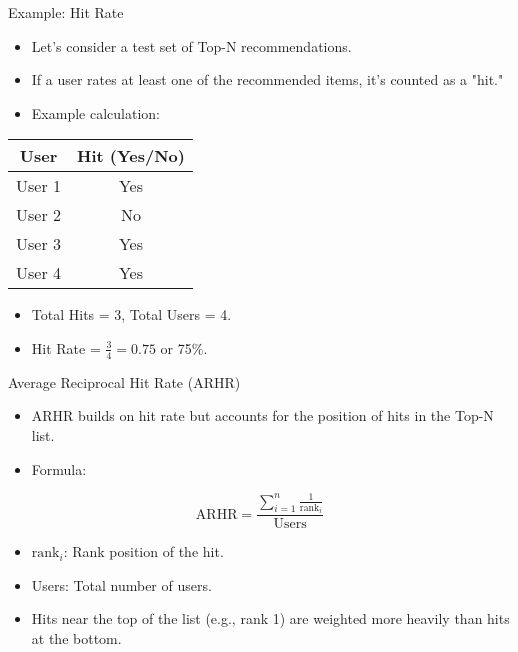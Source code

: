 \documentclass{beamer}
\begin{document}
\begin{frame}{Example: Hit Rate}
\begin{itemize}
    \item Let’s consider a test set of Top-N recommendations.
    \item If a user rates at least one of the recommended items, it’s counted as a "hit."
    \item Example calculation:
\end{itemize}

\begin{center}
\begin{tabular}{|c|c|}
\hline
\textbf{User} & \textbf{Hit (Yes/No)} \\ \hline
User 1 & Yes \\ \hline
User 2 & No \\ \hline
User 3 & Yes \\ \hline
User 4 & Yes \\ \hline
\end{tabular}
\end{center}

\begin{itemize}
    \item Total Hits = 3, Total Users = 4.
    \item Hit Rate = \( \frac{3}{4} = 0.75 \) or 75\%.
\end{itemize}
\end{frame}

\begin{frame}{Average Reciprocal Hit Rate (ARHR)}
\begin{itemize}
    \item ARHR builds on hit rate but accounts for the position of hits in the Top-N list.
    \item Formula:
\end{itemize}
\[
\text{ARHR} = \frac{\sum_{i=1}^{n} \frac{1}{\text{rank}_i}}{\text{Users}}
\]
\begin{itemize}
    \item \( \text{rank}_i \): Rank position of the hit.
    \item Users: Total number of users.
\end{itemize}

\begin{itemize}
    \item Hits near the top of the list (e.g., rank 1) are weighted more heavily than hits at the bottom.
\end{itemize}
\end{frame}
\end{document}
